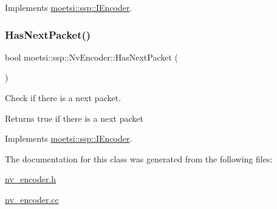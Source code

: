 Implements \hyperlink{classmoetsi_1_1ssp_1_1IEncoder_ae6a865aa52230d81aed1cb5232402f6c}{moetsi\+::ssp\+::\+I\+Encoder}.

\mbox{\label{classmoetsi_1_1ssp_1_1NvEncoder_a4c0874d9d0d767ae7a33fe9c9a1be1de}} 
\subsubsection{\texorpdfstring{Has\+Next\+Packet()}{HasNextPacket()}}
{\footnotesize\ttfamily bool moetsi\+::ssp\+::\+Nv\+Encoder\+::\+Has\+Next\+Packet (\begin{DoxyParamCaption}{ }\end{DoxyParamCaption})\hspace{0.3cm}{\ttfamily [virtual]}}



Check if there is a next packet. 

\begin{DoxyReturn}{Returns}
true if there is a next packet 
\end{DoxyReturn}


Implements \hyperlink{classmoetsi_1_1ssp_1_1IEncoder_a2af8e23d841ef61f6ee4037e56a3694d}{moetsi\+::ssp\+::\+I\+Encoder}.



The documentation for this class was generated from the following files\+:\begin{DoxyCompactItemize}
\item 
\hyperlink{nv__encoder_8h}{nv\+\_\+encoder.\+h}\item 
\hyperlink{nv__encoder_8cc}{nv\+\_\+encoder.\+cc}\end{DoxyCompactItemize}
